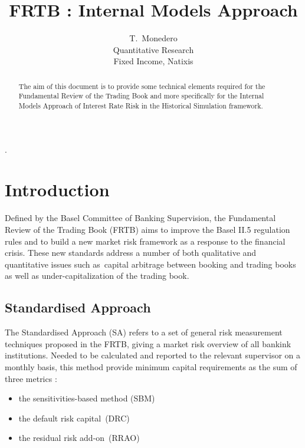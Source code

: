 \documentclass[3pt]{article}
\begin{document}
\title{FRTB : Internal Models Approach}
\author{T.\ Monedero \\
Quantitative Research\\
Fixed Income, Natixis\\
}
\maketitle

\begin{abstract}
The aim of this document is to provide some technical elements required for
the Fundamental Review of the Trading Book and more specifically for the
Internal Models Approach of Interest Rate Risk  in the Historical Simulation
framework.
\end{abstract}

\tableofcontents

.

\bigskip

\bigskip

\bigskip

\section{Introduction}

Defined by the Basel Committee of Banking Supervision, the Fundamental
Review of the Trading Book (FRTB) aims to improve the Basel II.5 regulation
rules and to build a new market risk framework as a response to the
financial crisis. These new standards address a number of both qualitative
and quantitative issues such as\ capital arbitrage between booking and
trading books as well as under-capitalization of the trading book.

\subsection{Standardised Approach}

The Standardised Approach (SA) refers to a set of general risk measurement
techniques proposed in the FRTB, giving a market risk overview of all
bankink institutions. Needed to be calculated and reported to the relevant
supervisor on a monthly basis, this method provide minimum capital
requirements as the sum of three metrics : 

\bigskip 

\begin{itemize}
\item the sensitivities-based method (SBM)

\item the default risk capital\ (DRC)

\item the residual risk add-on\ (RRAO)
\end{itemize}
\end{document}
